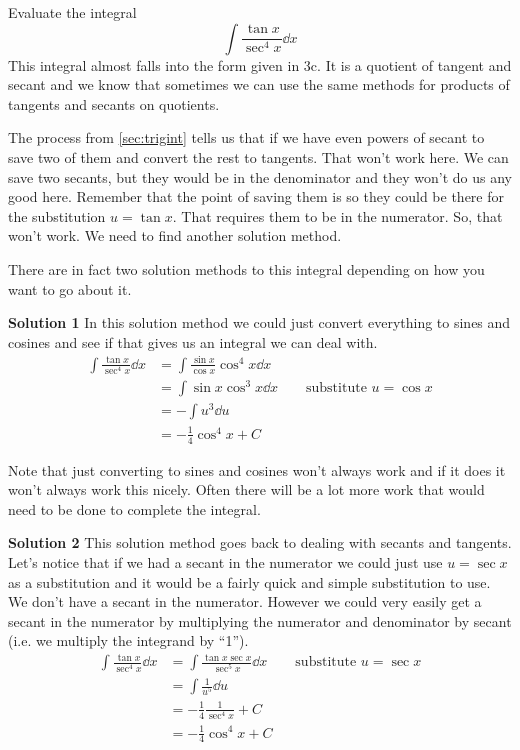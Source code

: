 \begin{example}\label{ex_int_strat_tan_sec}%
Evaluate the integral
\[\int \frac{\tan x}{\sec^4 x}\dd x\]
\solution
This integral almost falls into the form given in 3c. It is a quotient of tangent and secant and we know that sometimes we can use the same methods for products of tangents and secants on quotients.

The process from \autoref{sec:trigint} tells us that if we have even powers of secant to save two of them and convert the rest to tangents. That won't work here. We can save two secants, but they would be in the denominator and they won't do us any good here. Remember that the point of saving them is so they could be there for the substitution $u = \tan x$. That requires them to be in the numerator. So, that won't work. We need to find another solution method.

There are in fact two solution methods to this integral depending on how you want to go about it.

\textbf{Solution 1} \indent In this solution method we could just convert everything to sines and cosines and see if that gives us an integral we can deal with.
\begin{align*}
	\int \frac{\tan x}{\sec^4 x}\dd x
	&= \int \frac{\sin x}{\cos x} \cos^4 x\dd x\\
	&= \int \sin x \cos^3 x\dd x \qquad\text{substitute $u = \cos x$}\\
	&= -\int u^3\dd u \\
	&=-\frac{1}{4} \cos^4 x +C
\end{align*}

Note that just converting to sines and cosines won't always work and if it does it won't always work this nicely. Often there will be a lot more work that would need to be done to complete the integral.\bigskip

\textbf{Solution 2} \indent This solution method goes back to dealing with secants and tangents. Let's notice that if we had a secant in the numerator we could just use $u = \sec x$ as a substitution and it would be a fairly quick and simple substitution to use. We don't have a secant in the numerator. However we could very easily get a secant in the numerator by multiplying the numerator and denominator by secant (i.e. we multiply the integrand by ``1''). 
\begin{align*}
	\int \frac{\tan x}{\sec^4 x}\dd x
	&= \int \frac{\tan x \sec x}{\sec^5 x}\dd x \qquad\text{substitute $u = \sec x$}\\
	&= \int \frac{1}{u^5}\dd u \\
	&=-\frac{1}{4} \frac{1}{\sec^4 x}+C\\
	&=-\frac{1}{4} \cos^4 x +C
\end{align*}
\end{example}

